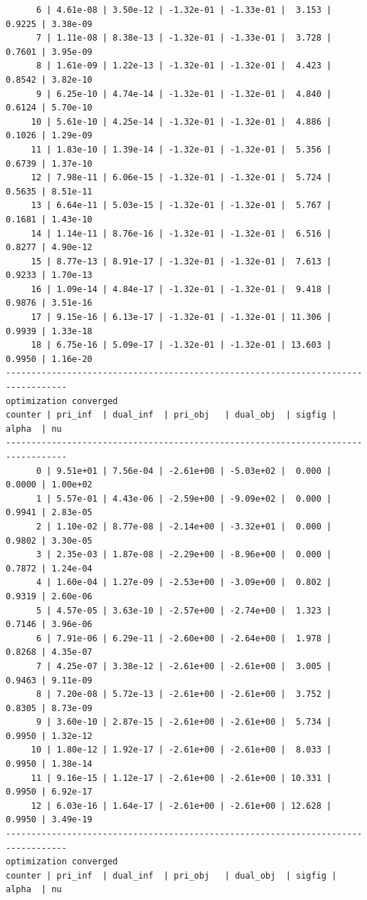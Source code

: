\documentclass[
]{book}
\begin{document}
\begin{verbatim}
      6 | 4.61e-08 | 3.50e-12 | -1.32e-01 | -1.33e-01 |  3.153 | 0.9225 | 3.38e-09
      7 | 1.11e-08 | 8.38e-13 | -1.32e-01 | -1.33e-01 |  3.728 | 0.7601 | 3.95e-09
      8 | 1.61e-09 | 1.22e-13 | -1.32e-01 | -1.32e-01 |  4.423 | 0.8542 | 3.82e-10
      9 | 6.25e-10 | 4.74e-14 | -1.32e-01 | -1.32e-01 |  4.840 | 0.6124 | 5.70e-10
     10 | 5.61e-10 | 4.25e-14 | -1.32e-01 | -1.32e-01 |  4.886 | 0.1026 | 1.29e-09
     11 | 1.83e-10 | 1.39e-14 | -1.32e-01 | -1.32e-01 |  5.356 | 0.6739 | 1.37e-10
     12 | 7.98e-11 | 6.06e-15 | -1.32e-01 | -1.32e-01 |  5.724 | 0.5635 | 8.51e-11
     13 | 6.64e-11 | 5.03e-15 | -1.32e-01 | -1.32e-01 |  5.767 | 0.1681 | 1.43e-10
     14 | 1.14e-11 | 8.76e-16 | -1.32e-01 | -1.32e-01 |  6.516 | 0.8277 | 4.90e-12
     15 | 8.77e-13 | 8.91e-17 | -1.32e-01 | -1.32e-01 |  7.613 | 0.9233 | 1.70e-13
     16 | 1.09e-14 | 4.84e-17 | -1.32e-01 | -1.32e-01 |  9.418 | 0.9876 | 3.51e-16
     17 | 9.15e-16 | 6.13e-17 | -1.32e-01 | -1.32e-01 | 11.306 | 0.9939 | 1.33e-18
     18 | 6.75e-16 | 5.09e-17 | -1.32e-01 | -1.32e-01 | 13.603 | 0.9950 | 1.16e-20
----------------------------------------------------------------------------------
optimization converged
counter | pri_inf  | dual_inf  | pri_obj   | dual_obj  | sigfig | alpha  | nu 
----------------------------------------------------------------------------------
      0 | 9.51e+01 | 7.56e-04 | -2.61e+00 | -5.03e+02 |  0.000 | 0.0000 | 1.00e+02
      1 | 5.57e-01 | 4.43e-06 | -2.59e+00 | -9.09e+02 |  0.000 | 0.9941 | 2.83e-05
      2 | 1.10e-02 | 8.77e-08 | -2.14e+00 | -3.32e+01 |  0.000 | 0.9802 | 3.30e-05
      3 | 2.35e-03 | 1.87e-08 | -2.29e+00 | -8.96e+00 |  0.000 | 0.7872 | 1.24e-04
      4 | 1.60e-04 | 1.27e-09 | -2.53e+00 | -3.09e+00 |  0.802 | 0.9319 | 2.60e-06
      5 | 4.57e-05 | 3.63e-10 | -2.57e+00 | -2.74e+00 |  1.323 | 0.7146 | 3.96e-06
      6 | 7.91e-06 | 6.29e-11 | -2.60e+00 | -2.64e+00 |  1.978 | 0.8268 | 4.35e-07
      7 | 4.25e-07 | 3.38e-12 | -2.61e+00 | -2.61e+00 |  3.005 | 0.9463 | 9.11e-09
      8 | 7.20e-08 | 5.72e-13 | -2.61e+00 | -2.61e+00 |  3.752 | 0.8305 | 8.73e-09
      9 | 3.60e-10 | 2.87e-15 | -2.61e+00 | -2.61e+00 |  5.734 | 0.9950 | 1.32e-12
     10 | 1.80e-12 | 1.92e-17 | -2.61e+00 | -2.61e+00 |  8.033 | 0.9950 | 1.38e-14
     11 | 9.16e-15 | 1.12e-17 | -2.61e+00 | -2.61e+00 | 10.331 | 0.9950 | 6.92e-17
     12 | 6.03e-16 | 1.64e-17 | -2.61e+00 | -2.61e+00 | 12.628 | 0.9950 | 3.49e-19
----------------------------------------------------------------------------------
optimization converged
counter | pri_inf  | dual_inf  | pri_obj   | dual_obj  | sigfig | alpha  | nu 

\end{verbatim}
\end{document}
